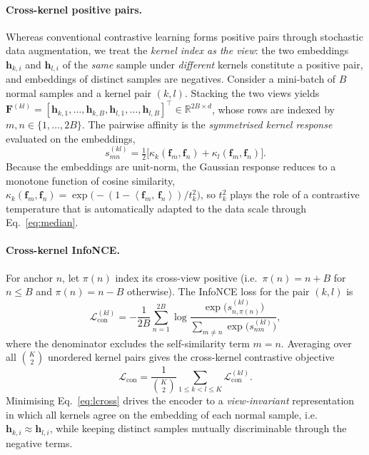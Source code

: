 \documentclass[times, review, 10pt]{elsarticle}
\newcommand{\R}{\mathbb{R}}
\newcommand{\inner}[2]{\left\langle #1,\, #2 \right\rangle}
\newcommand{\Lcross}{\mathcal{L}_{\mathrm{con}}}
\newcommand{\hh}{\bm{h}}
\begin{document}
\paragraph{Cross-kernel positive pairs.}
Whereas conventional contrastive learning forms positive pairs through
stochastic data augmentation, we treat the \emph{kernel index as the view}: the
two embeddings $\hh_{k,i}$ and $\hh_{l,i}$ of the \emph{same} sample under
\emph{different} kernels constitute a positive pair, and embeddings of distinct
samples are negatives. Consider a mini-batch of $B$ normal samples and a kernel
pair $(k,l)$. Stacking the two views yields
$\bm{F}^{(kl)}=[\hh_{k,1},\dots,\hh_{k,B},\hh_{l,1},\dots,\hh_{l,B}]^{\!\top}
\in\R^{2B\times d}$,
whose rows are indexed by $m,n\in\{1,\dots,2B\}$. The pairwise affinity is the
\emph{symmetrised kernel response} evaluated on the embeddings,
\begin{equation}
s^{(kl)}_{mn}
=\tfrac{1}{2}\big[\kappa_k(\bm{f}_m,\bm{f}_n)
+\kappa_l(\bm{f}_m,\bm{f}_n)\big].
\label{eq:affinity}
\end{equation}
Because the embeddings are unit-norm, the Gaussian response reduces to a
monotone function of cosine similarity,
$\kappa_k(\bm{f}_m,\bm{f}_n)
=\exp\!\big(-(1-\inner{\bm{f}_m}{\bm{f}_n})/t_k^{2}\big)$,
so $t_k^{2}$ plays the role of a contrastive temperature that is automatically
adapted to the data scale through Eq.~\eqref{eq:median}.

\paragraph{Cross-kernel InfoNCE.}
For anchor $n$, let $\pi(n)$ index its cross-view positive (i.e.\ $\pi(n)=n+B$
for $n\le B$ and $\pi(n)=n-B$ otherwise). The InfoNCE loss for the pair $(k,l)$
is
\begin{equation}
\Lcross^{(kl)}
=-\frac{1}{2B}\sum_{n=1}^{2B}
\log\frac{\exp\!\big(s^{(kl)}_{n,\pi(n)}\big)}
{\displaystyle\sum_{m\neq n}\exp\!\big(s^{(kl)}_{nm}\big)},
\label{eq:infonce}
\end{equation}
where the denominator excludes the self-similarity term $m=n$. Averaging over
all $\binom{K}{2}$ unordered kernel pairs gives the cross-kernel contrastive
objective
\begin{equation}
\Lcross
=\frac{1}{\binom{K}{2}}
\sum_{1\le k<l\le K}\Lcross^{(kl)}.
\label{eq:lcross}
\end{equation}
Minimising Eq.~\eqref{eq:lcross} drives the encoder to a \emph{view-invariant}
representation in which all kernels agree on the embedding of each normal
sample, i.e.\ $\hh_{k,i}\!\approx\!\hh_{l,i}$, while keeping distinct samples
mutually discriminable through the negative terms.
\end{document}
